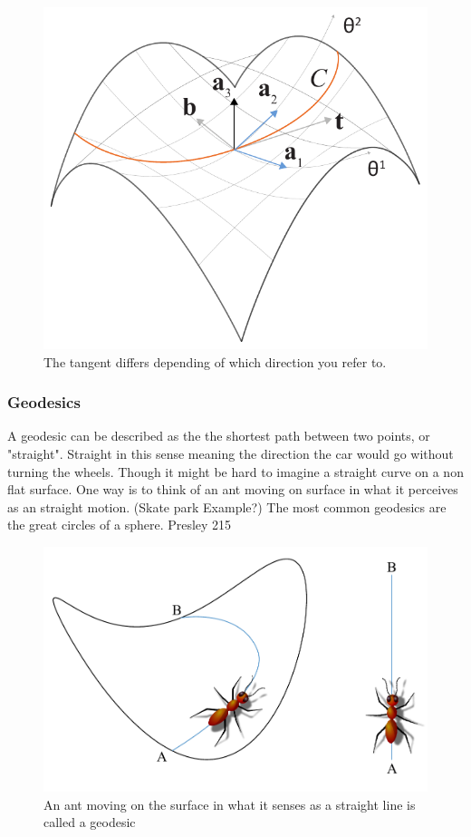 \begin{figure}[H]
\centering
\includegraphics[width=0.7\linewidth ]{figure/Theory/CurveOnSurface.pdf}
\caption{The tangent differs depending of which direction you refer to. }
\end{figure}



\subsubsection{Geodesics} \label{sec:geodesics}

A geodesic can be described as the the shortest path between two points, or "straight". Straight in this sense meaning the direction the car would go without turning the wheels. Though it might be hard to imagine a straight curve on a non flat surface. One way is to think of an ant moving on surface in what it perceives as an straight motion. (Skate park Example?) The most common geodesics are the great circles of a sphere. Presley 215

\begin{figure}[H]
\centering
\includegraphics[width=0.7\linewidth ]{figure/Theory/Geodesics.pdf}
\caption{An ant moving on the surface in what it senses as a straight line is called a geodesic }
\end{figure}

